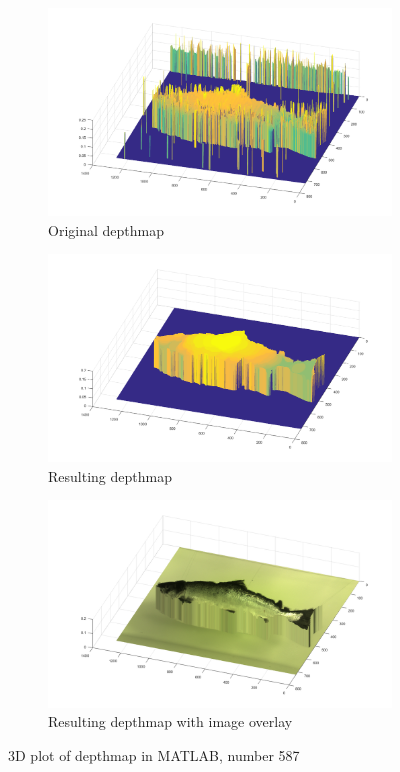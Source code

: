 \begin{figure}[H]
    \centering
    \begin{subfigure}{1\textwidth}
        \centering
        \includegraphics[width=.65\linewidth]{images/results/3D_plots/original_3D_87}
        \caption{Original depthmap} 
        \label{fig:3D_original_87}
    \end{subfigure}\hspace*{\fill}
    
    \medskip
    \begin{subfigure}{1\textwidth}
        \centering
        \includegraphics[width=.65\linewidth]{images/results/3D_plots/fixed_3D_87}
        \caption{Resulting depthmap} 
        \label{fig:3D_fixed_87}
    \end{subfigure}\hspace*{\fill}
    
    \medskip
    \begin{subfigure}{1\textwidth}
        \centering
        \includegraphics[width=.65\linewidth]{images/results/3D_plots/fixed_3D_fish_87}
        \caption{Resulting depthmap with image overlay} 
        \label{fig:3D_fixed_fish_87}
    \end{subfigure}\hspace*{\fill}
    \caption{3D plot of depthmap in MATLAB, number 587}
    \label{fig:3D_plot_87}
\end{figure}





